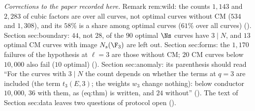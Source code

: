 \begin{sloppypar}
\emph{Corrections to the paper recorded here.} Remark rem:wild: the counts $1{,}143$ and $2{,}283$ of cubic factors are over all curves, not optimal curves
without CM ($534$ and $1{,}308$), and its $58\%$ is a share among optimal curves ($61\%$ over all curves) (). Section sec:boundary:
$44$, not $28$, of the $90$ optimal $\Ns$ curves have $3\mid N$, and $13$ optimal CM curves with image $N_s(\F_3)$ are left out. Section sec:forms: the
$1{,}170$ failures of the hypothesis at $\ell=3$ are those without CM; $20$ CM curves below $10{,}000$ also fail ($10$ optimal)
(). Section sec:anomaly: its parenthesis should read ``For the curves with $3\mid N$ the count depends on whether the terms at $q=3$ are
included (the term $t_3(E,3)$; the weights $w_3$ change nothing): below conductor $10{,}000$, $36$ with them, as (eq:thm) is written, and $24$ without''
(). The text of Section sec:data leaves two questions of protocol open ().
\end{sloppypar}
